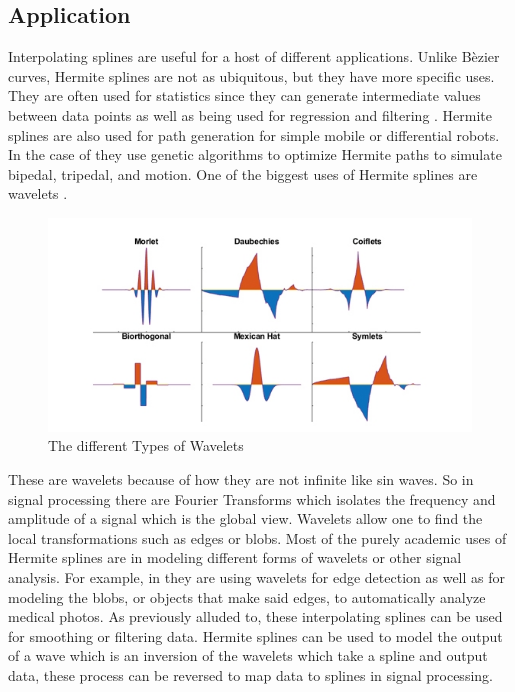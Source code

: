 \documentclass[12pt, letterpaper]{article}
\begin{document}
\subsection{Application}
Interpolating splines are useful for a host of different applications. Unlike B\`ezier curves, Hermite splines
are not as ubiquitous, but they have more specific uses. They are often used for statistics since they can
generate intermediate values between data points as well as being used for regression and filtering
\citep{HRegression}. Hermite splines are also used for path generation for simple mobile or differential
robots. In the case of \citep{HMove} they use genetic algorithms to optimize Hermite paths to simulate
bipedal, tripedal, and  motion. One of the biggest uses of Hermite splines are wavelets
\citep{HWavelets}.

\begin{figure}[ht]
  \label{fig:wavelet}
  \centering
  \caption{The different Types of Wavelets}
  \includegraphics[width=\linewidth]{wavelets}
\end{figure}

These are wavelets because of how they are not infinite like sin waves. So in signal processing there are
Fourier Transforms which isolates the frequency and amplitude of a signal which is the global view. Wavelets
allow one to find the local transformations such as edges or blobs. Most of the purely academic uses of
Hermite splines are in modeling different forms of wavelets or other signal analysis. For example, in
\citep{HBioMed} they are using wavelets for edge detection as well as for modeling the blobs, or objects that
make said edges, to automatically analyze medical photos. As previously alluded to, these interpolating splines
can be used for smoothing or filtering data. Hermite splines can be used to model the output of a wave
\citep{HCardo} which is an inversion of the wavelets which take a spline and output data, these process can be
reversed to map data to splines in signal processing.
\end{document}
